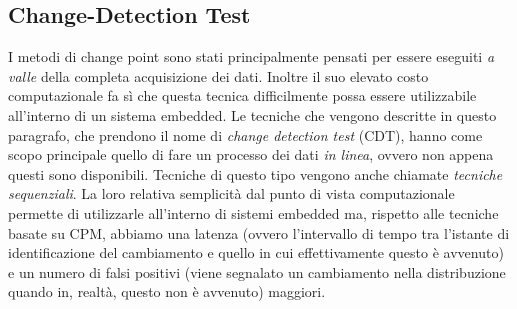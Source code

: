 \subsection{Change-Detection Test}
I metodi di change point sono stati principalmente
pensati per essere eseguiti \textit{a valle} della
completa acquisizione dei dati. Inoltre il suo elevato
costo computazionale fa s\`i che questa tecnica
difficilmente possa essere utilizzabile all'interno di
un sistema embedded. Le tecniche che vengono descritte
in questo paragrafo, che prendono il nome di
\textit{change detection test} (CDT), hanno come scopo
principale quello di fare un processo dei dati
\textit{in linea}, ovvero non appena questi sono
disponibili. Tecniche di questo tipo vengono anche
chiamate \textit{tecniche sequenziali}. La loro
relativa semplicit\`a dal punto di vista
computazionale permette di utilizzarle all'interno di
sistemi embedded ma, rispetto alle tecniche basate su
CPM, abbiamo una latenza (ovvero l'intervallo di tempo
tra l'istante di identificazione del cambiamento e
quello in cui effettivamente questo \`e avvenuto) e un
numero di falsi positivi (viene segnalato un
cambiamento nella distribuzione quando in, realt\`a,
questo non \`e avvenuto) maggiori.
